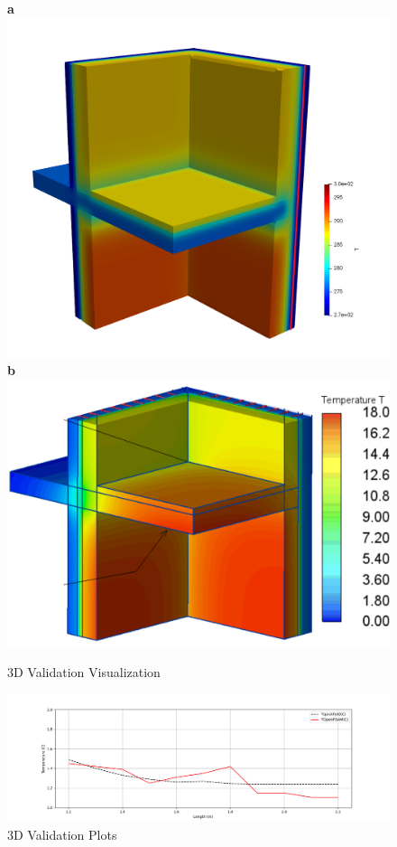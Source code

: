 \begin{figure}[H]
    \centering
    \textbf{a}\includegraphics[width=0.65\columnwidth]{Figures/casewoutair.png}
    \textbf{b}\includegraphics[width=0.65\columnwidth]{Figures/ValidationCaseClean.png}
\hspace{0.7cm}
    \caption{3D Validation Visualization}
    \label{paraview}
\end{figure}



\begin{figure}[H] 
\centering
\includegraphics[width=0.8\columnwidth]{Figures/Figure_2.png}
\hspace{0.7cm}
\caption[3D Validation Plots]{3D Validation Plots}
\label{fig:validation-plots}
\end{figure}



